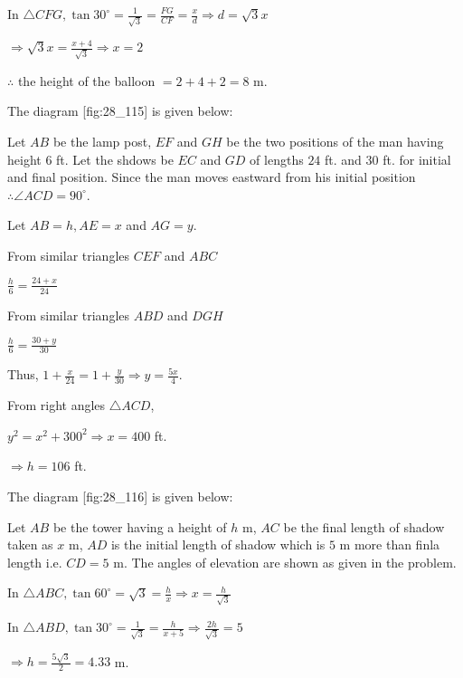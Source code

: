   In $\triangle CFG, \tan30^\circ = \frac{1}{\sqrt{3}} = \frac{FG}{CF} = \frac{x}{d}\Rightarrow d = \sqrt{3}x$

  $\Rightarrow \sqrt{3}x = \frac{x + 4}{\sqrt{3}}\Rightarrow x = 2$

  $\therefore$ the height of the balloon $= 2 + 4 + 2 = 8$ m.

\item The diagram [fig:28_115] is given below:

  \startplacefigure[reference=fig:28_115]
    \externalfigure[28_115.pdf]
  \stopplacefigure

  Let $AB$ be the lamp post, $EF$ and $GH$ be the two positions of the man having
  height $6$ ft. Let the shdows be $EC$ and $GD$ of lengths $24$ ft. and
  $30$ ft. for initial and final position. Since the man moves eastward from his initial position
  $\therefore \angle ACD = 90^\circ$.

  Let $AB = h, AE = x$ and $AG = y$.

  From similar triangles $CEF$ and $ABC$

  $\frac{h}{6} = \frac{24 + x}{24}$

  From similar triangles $ABD$ and $DGH$

  $\frac{h}{6} = \frac{30 + y}{30}$

  Thus, $1 + \frac{x}{24} = 1 + \frac{y}{30} \Rightarrow y = \frac{5x}{4}$.

  From right angles $\triangle ACD$,

  $y^2 = x^2 + 300^2 \Rightarrow x = 400$ ft.

  $\Rightarrow h = 106$ ft.

\item The diagram [fig:28_116] is given below:

  \startplacefigure[reference=fig:28_116]
    \externalfigure[28_116.pdf]
  \stopplacefigure

  Let $AB$ be the tower having a height of $h$ m, $AC$ be the final length of shadow taken as $x$ m,
  $AD$ is the initial length of shadow which is $5$ m more than finla length i.e. $CD = 5$ m. The angles of
  elevation are shown as given in the problem.

  In $\triangle ABC, \tan60^\circ = \sqrt{3} = \frac{h}{x} \Rightarrow x = \frac{h}{\sqrt{3}}$

  In $\triangle ABD, \tan30^\circ = \frac{1}{\sqrt{3}} = \frac{h}{x + 5} \Rightarrow \frac{2h}{\sqrt{3}} = 5$

  $\Rightarrow h = \frac{5\sqrt{3}}{2} = 4.33$ m.

